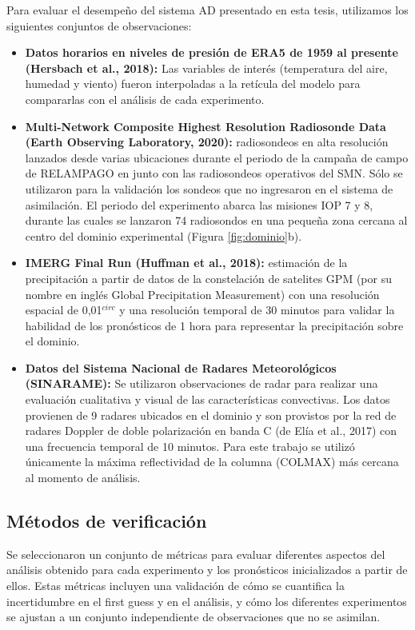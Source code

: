 \documentclass[12pt,twoside]{reedthesis}
\begin{document}
Para evaluar el desempeño del sistema AD presentado en esta tesis, utilizamos los siguientes conjuntos de observaciones:
\begin{itemize}
\item
  \textbf{Datos horarios en niveles de presión de ERA5 de 1959 al presente (Hersbach et al., 2018):} Las variables de interés (temperatura del aire, humedad y viento) fueron interpoladas a la retícula del modelo para compararlas con el análisis de cada experimento.
\item
  \textbf{Multi-Network Composite Highest Resolution Radiosonde Data (Earth Observing Laboratory, 2020):} radiosondeos en alta resolución lanzados desde varias ubicaciones durante el periodo de la campaña de campo de RELAMPAGO en junto con las radiosondeos operativos del SMN. Sólo se utilizaron para la validación los sondeos que no ingresaron en el sistema de asimilación. El periodo del experimento abarca las misiones IOP 7 y 8, durante las cuales se lanzaron 74 radiosondos en una pequeña zona cercana al centro del dominio experimental (Figura \ref{fig:dominio}b).
\item
  \textbf{IMERG Final Run (Huffman et al., 2018):} estimación de la precipitación a partir de datos de la constelación de satelites GPM (por su nombre en inglés Global Precipitation Measurement) con una resolución espacial de 0,01\(^{circ}\) y una resolución temporal de 30 minutos para validar la habilidad de los pronósticos de 1 hora para representar la precipitación sobre el dominio.
\item
  \textbf{Datos del Sistema Nacional de Radares Meteorológicos (SINARAME):} Se utilizaron observaciones de radar para realizar una evaluación cualitativa y visual de las características convectivas. Los datos provienen de 9 radares ubicados en el dominio y son provistos por la red de radares Doppler de doble polarización en banda C (de Elía et al., 2017) con una frecuencia temporal de 10 minutos. Para este trabajo se utilizó únicamente la máxima reflectividad de la columna (COLMAX) más cercana al momento de análisis.
\end{itemize}
\hypertarget{muxe9todos-de-verificaciuxf3n}{%
\subsection{Métodos de verificación}\label{muxe9todos-de-verificaciuxf3n}}

Se seleccionaron un conjunto de métricas para evaluar diferentes aspectos del análisis obtenido para cada experimento y los pronósticos inicializados a partir de ellos. Estas métricas incluyen una validación de cómo se cuantifica la incertidumbre en el first guess y en el análisis, y cómo los diferentes experimentos se ajustan a un conjunto independiente de observaciones que no se asimilan.
\end{document}

